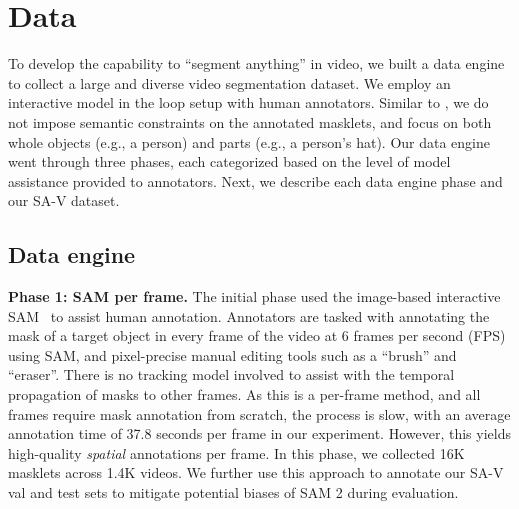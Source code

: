 \documentclass[]{fairmeta}
\renewcommand{\paragraph}[1]{\vspace{1.25mm}\noindent\textbf{#1}}
\newcommand{\saviPhaseOneVideos}{1.4K\xspace}
\newcommand{\saviPhaseOneMasklets}{16K\xspace}
\renewcommand{\paragraph}[1]{\vspace{1.25mm}\noindent\textbf{#1}}
\begin{document}
\section{Data}
\label{sec:data}


To develop the capability to ``segment anything'' in video, we built a data engine to collect a large and diverse video segmentation dataset. We employ an interactive model in the loop setup with human annotators. Similar to \cite{kirillov2023segment}, we do not impose semantic constraints on the annotated masklets, and focus on both whole objects (e.g., a person) and parts (e.g., a person's hat). Our data engine went through three phases, each categorized based on the level of model assistance provided to annotators. Next, we describe each data engine phase and our SA-V dataset.

\subsection{Data engine}
\label{sec:data_engine}

\paragraph{Phase 1: SAM per frame.} The initial phase used the image-based interactive SAM~\citep{kirillov2023segment} to assist human annotation. Annotators are tasked with annotating the mask of a target object in every frame of the video at 6 frames per second (FPS) using SAM, and pixel-precise manual editing tools such as a ``brush'' and ``eraser''. There is no tracking model involved to assist with the temporal propagation of masks to other frames. As this is a per-frame method, and all frames require mask annotation from scratch, the process is slow, with an average annotation time of 37.8 seconds per frame in our experiment. However, this yields high-quality \textit{spatial} annotations per frame. In this phase, we collected \saviPhaseOneMasklets masklets across \saviPhaseOneVideos videos. We further use this approach to annotate our SA-V val and test sets to mitigate potential biases of SAM 2 during evaluation.
\end{document}
